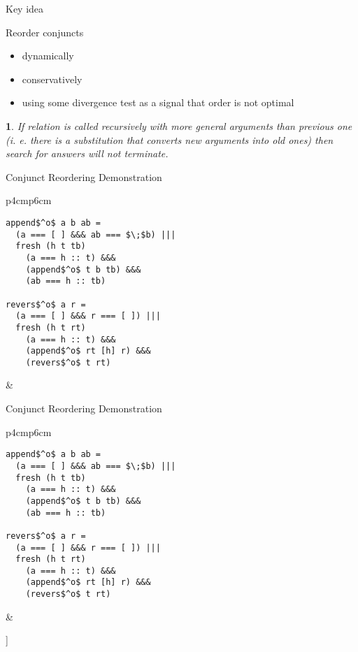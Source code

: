 \documentclass{beamer}
\theoremstyle{definition}
\theoremstyle{plain} %
\newcommand{\thistheoremname}{}
\newtheorem{genericthm}[thm]{\thistheoremname}
\newenvironment{namedthm}[1]
  {\renewcommand{\thistheoremname}{#1}%
   \begin{genericthm}}
  {\end{genericthm}}
\begin{document}
\begin{frame}{Key idea}

Reorder conjuncts
 \begin{itemize}
 \item dynamically
  
 \item conservatively
 
 \item using some divergence test as a signal that order is not optimal
 \end{itemize}
 
 \vskip1cm
 
 \begin{namedthm}{Divergence test}
If relation is called recursively with more general arguments than previous one (i. e. there is a substitution that converts new arguments into old ones) then search for answers will not terminate.
\end{namedthm}

\end{frame}

\begin{frame}[fragile]{Conjunct Reordering Demonstration}
  \begin{tabular}{p{4cm}p{6cm}}
    \begin{lstlisting}
append$^o$ a b ab =		
  (a === [ ] &&& ab === $\;$b) |||
  fresh (h t tb) 
    (a === h :: t) &&&
    (append$^o$ t b tb) &&&
    (ab === h :: tb)  
  
revers$^o$ a r =	
  (a === [ ] &&& r === [ ]) |||
  fresh (h t rt) 
    (a === h :: t) &&&
    (append$^o$ rt [h] r) &&&
    (revers$^o$ t rt)
\end{lstlisting}
&
\begin{center}
\end{center}
\end{tabular}
\end{frame}

\begin{frame}[fragile]{Conjunct Reordering Demonstration}
  \begin{tabular}{p{4cm}p{6cm}}
    \begin{lstlisting}
append$^o$ a b ab =		
  (a === [ ] &&& ab === $\;$b) |||
  fresh (h t tb) 
    (a === h :: t) &&&
    (append$^o$ t b tb) &&&
    (ab === h :: tb)  
  
revers$^o$ a r =	
  (a === [ ] &&& r === [ ]) |||
  fresh (h t rt) 
    (a === h :: t) &&&
    (append$^o$ rt [h] r) &&&
    (revers$^o$ t rt)
\end{lstlisting}
&
\begin{center}
   \Tree [.{\lstinline|revers$^o\; [1,\,2,\,3]\; r$|}  [.{$[1,\,2,\,3]\not\equiv [\;]$} ] [.{$\ldots$} ] ]
\end{center}
\end{tabular}
\end{frame}
\end{document}
